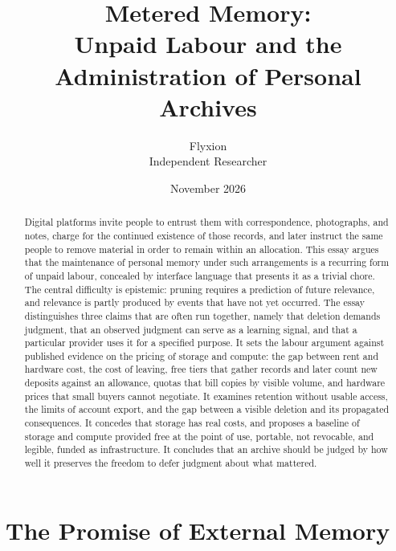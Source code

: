 \documentclass[12pt]{article}
\title{Metered Memory:\\Unpaid Labour and the Administration of Personal Archives}
\author{Flyxion\\Independent Researcher}
\date{November 2026}
\begin{document}
\maketitle

\begin{abstract}
\noindent Digital platforms invite people to entrust them with correspondence, photographs, and notes, charge for the continued existence of those records, and later instruct the same people to remove material in order to remain within an allocation. This essay argues that the maintenance of personal memory under such arrangements is a recurring form of unpaid labour, concealed by interface language that presents it as a trivial chore. The central difficulty is epistemic: pruning requires a prediction of future relevance, and relevance is partly produced by events that have not yet occurred. The essay distinguishes three claims that are often run together, namely that deletion demands judgment, that an observed judgment can serve as a learning signal, and that a particular provider uses it for a specified purpose. It sets the labour argument against published evidence on the pricing of storage and compute: the gap between rent and hardware cost, the cost of leaving, free tiers that gather records and later count new deposits against an allowance, quotas that bill copies by visible volume, and hardware prices that small buyers cannot negotiate. It examines retention without usable access, the limits of account export, and the gap between a visible deletion and its propagated consequences. It concedes that storage has real costs, and proposes a baseline of storage and compute provided free at the point of use, portable, not revocable, and legible, funded as infrastructure. It concludes that an archive should be judged by how well it preserves the freedom to defer judgment about what mattered.
\end{abstract}

\section{The Promise of External Memory}
\end{document}
